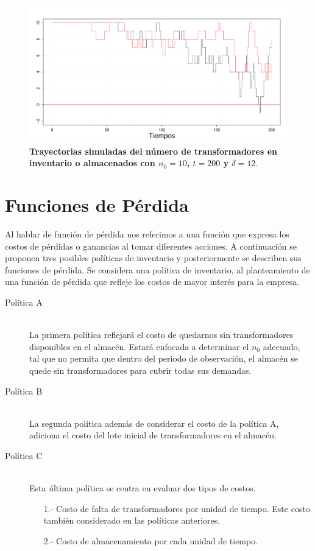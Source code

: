\begin{figure}
\begin{center}
\includegraphics[scale=0.3]{Rplot10.pdf}
\end{center}
\vspace{-1 cm}\caption{\bf Trayectorias simuladas del n\'umero de transformadores en inventario o almacenados con $n_0=10$, $t=200$ y $\delta=12.$}\label{d12}
\end{figure}


\section{Funciones de P\'erdida}

\noindent Al hablar de funci\'on de p\'erdida nos referimos a una funci\'on que expresa los costos de p\'erdidas o ganancias  al tomar diferentes acciones. A continuaci\'on se proponen tres posibles pol\'iticas de inventario y posteriormente se describen sus funciones de p\'erdida. Se considera una pol\'itica de inventario, al planteamiento de una funci\'on de p\'erdida que refleje los costos de mayor inter\'es para la empresa.



\begin{description}
\item [Pol\'itica A] \hfill \\ 
La primera pol\'itica reflejar\'a el costo de quedarnos sin transformadores disponibles en el almac\'en. Estar\'a  enfocada a determinar el $n_0$ adecuado, tal que no permita que dentro del periodo de observaci\'on, el almac\'en se quede sin transformadores para cubrir todas sus demandas.
\item [Pol\'itica B] \hfill \\
La segunda pol\'itica adem\'as de considerar el costo de la pol\'itica A, adiciona el costo del lote inicial de transformadores en el almac\'en. 
\item [Pol\'itica C] \hfill \\
Esta \'ultima pol\'itica se centra en evaluar dos tipos de costos.
\begin{itemize}
\item[1.-] Costo de falta de transformadores por unidad de tiempo. Este costo tambi\'en considerado en las pol\'iticas anteriores.
\item[2.-] Costo de almacenamiento por cada unidad de tiempo.
\end{itemize}
\end{description}

